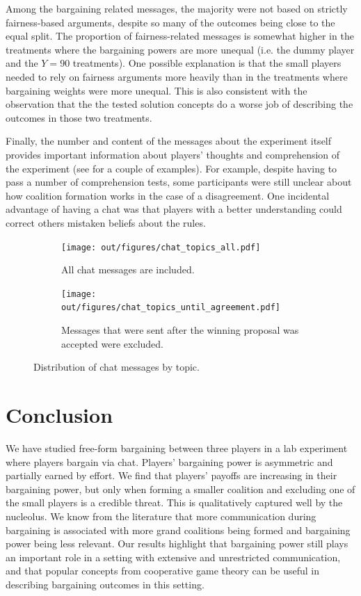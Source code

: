 \documentclass[12pt]{article}
\begin{document}
Among the bargaining related messages, the majority were not based on strictly fairness-based arguments, despite so many of the outcomes being close to the equal split. The proportion of fairness-related messages is somewhat higher in the treatments where the bargaining powers are more unequal (i.e. the dummy player and the $Y=90$ treatments). One possible explanation is that the small players needed to rely on fairness arguments more heavily than in the treatments where bargaining weights were more unequal. This is also consistent with the observation that the the tested solution concepts do a worse job of describing the outcomes in those two treatments.

Finally, the number and content of the messages about the experiment itself provides important information about players' thoughts and comprehension of the experiment (see  for a couple of examples). For example, despite having to pass a number of comprehension tests, some participants were still unclear about how coalition formation works in the case of a disagreement. One incidental advantage of having a chat was that players with a better understanding could correct others mistaken beliefs about the rules.


\begin{figure}[!htb]
    \centering
    \begin{subfigure}[b]{\textwidth}
        \centering
        \texttt{[image: out/figures/chat\_topics\_all.pdf]}
        \caption{All chat messages are included.}
        \label{fig:chat_topics_all}
    \end{subfigure}
    \vfill
    \begin{subfigure}[b]{\textwidth}
        \centering
        \texttt{[image: out/figures/chat\_topics\_until\_agreement.pdf]}
        \caption{Messages that were sent after the winning proposal was accepted were excluded.}
        \label{fig:chat_topics_until_agreement}
    \end{subfigure}
   \caption{Distribution of chat messages by topic.}
\end{figure}

\section{Conclusion} \label{sec:conclusion}

We have studied free-form bargaining between three players in a lab experiment where players bargain via chat. Players' bargaining power is asymmetric and partially earned by effort. We find that players' payoffs are increasing in their bargaining power, but only when forming a smaller coalition and excluding one of the small players is a credible threat. This is qualitatively captured well by the nucleolus. We know from the literature that more communication during bargaining is associated with more grand coalitions being formed and bargaining power being less relevant. Our results highlight that bargaining power still plays an important role in a setting with extensive and unrestricted communication, and that popular concepts from cooperative game theory can be useful in describing bargaining outcomes in this setting. 
\end{document}
